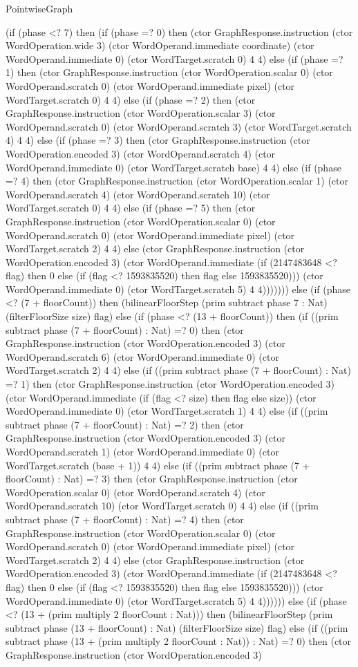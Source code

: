 \begin{lexlean}{PointwiseGraph}
\begin{semanticmodule}
{      (if (phase <? 7) then (if (phase =? 0) then (ctor GraphResponse.instruction (ctor WordOperation.wide 3) (ctor WordOperand.immediate coordinate) (ctor WordOperand.immediate 0) (ctor WordTarget.scratch 0) 4 4) else (if (phase =? 1) then (ctor GraphResponse.instruction (ctor WordOperation.scalar 0) (ctor WordOperand.scratch 0) (ctor WordOperand.immediate pixel) (ctor WordTarget.scratch 0) 4 4) else (if (phase =? 2) then (ctor GraphResponse.instruction (ctor WordOperation.scalar 3) (ctor WordOperand.scratch 0) (ctor WordOperand.scratch 3) (ctor WordTarget.scratch 4) 4 4) else (if (phase =? 3) then (ctor GraphResponse.instruction (ctor WordOperation.encoded 3) (ctor WordOperand.scratch 4) (ctor WordOperand.immediate 0) (ctor WordTarget.scratch base) 4 4) else (if (phase =? 4) then (ctor GraphResponse.instruction (ctor WordOperation.scalar 1) (ctor WordOperand.scratch 4) (ctor WordOperand.scratch 10) (ctor WordTarget.scratch 0) 4 4) else (if (phase =? 5) then (ctor GraphResponse.instruction (ctor WordOperation.scalar 0) (ctor WordOperand.scratch 0) (ctor WordOperand.immediate pixel) (ctor WordTarget.scratch 2) 4 4) else (ctor GraphResponse.instruction (ctor WordOperation.encoded 3) (ctor WordOperand.immediate (if (2147483648 <? flag) then 0 else (if (flag <? 1593835520) then flag else 1593835520))) (ctor WordOperand.immediate 0) (ctor WordTarget.scratch 5) 4 4))))))) else (if (phase <? (7 + floorCount)) then (bilinearFloorStep (prim subtract phase 7 : Nat) (filterFloorSize size) flag) else (if (phase <? (13 + floorCount)) then (if ((prim subtract phase (7 + floorCount) : Nat) =? 0) then (ctor GraphResponse.instruction (ctor WordOperation.encoded 3) (ctor WordOperand.scratch 6) (ctor WordOperand.immediate 0) (ctor WordTarget.scratch 2) 4 4) else (if ((prim subtract phase (7 + floorCount) : Nat) =? 1) then (ctor GraphResponse.instruction (ctor WordOperation.encoded 3) (ctor WordOperand.immediate (if (flag <? size) then flag else size)) (ctor WordOperand.immediate 0) (ctor WordTarget.scratch 1) 4 4) else (if ((prim subtract phase (7 + floorCount) : Nat) =? 2) then (ctor GraphResponse.instruction (ctor WordOperation.encoded 3) (ctor WordOperand.scratch 1) (ctor WordOperand.immediate 0) (ctor WordTarget.scratch (base + 1)) 4 4) else (if ((prim subtract phase (7 + floorCount) : Nat) =? 3) then (ctor GraphResponse.instruction (ctor WordOperation.scalar 0) (ctor WordOperand.scratch 4) (ctor WordOperand.scratch 10) (ctor WordTarget.scratch 0) 4 4) else (if ((prim subtract phase (7 + floorCount) : Nat) =? 4) then (ctor GraphResponse.instruction (ctor WordOperation.scalar 0) (ctor WordOperand.scratch 0) (ctor WordOperand.immediate pixel) (ctor WordTarget.scratch 2) 4 4) else (ctor GraphResponse.instruction (ctor WordOperation.encoded 3) (ctor WordOperand.immediate (if (2147483648 <? flag) then 0 else (if (flag <? 1593835520) then flag else 1593835520))) (ctor WordOperand.immediate 0) (ctor WordTarget.scratch 5) 4 4)))))) else (if (phase <? (13 + (prim multiply 2 floorCount : Nat))) then (bilinearFloorStep (prim subtract phase (13 + floorCount) : Nat) (filterFloorSize size) flag) else (if ((prim subtract phase (13 + (prim multiply 2 floorCount : Nat)) : Nat) =? 0) then (ctor GraphResponse.instruction (ctor WordOperation.encoded 3) }
\end{semanticmodule}
\end{lexlean}
